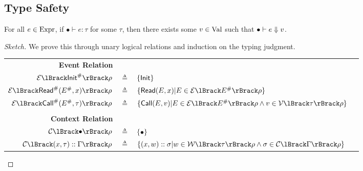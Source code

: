 \subsection{Type Safety}
\begin{theorem}\normalfont
  For all $e\in\text{Expr}$, if $\bullet\vdash e:\tau$ for some $\tau$, then there exists some $v\in\text{Val}$ such that $\bullet\vdash e\Downarrow v$.
\end{theorem}
\begin{proof}[Sketch]
  We prove this through unary logical relations and induction on the typing judgment.

  \begin{tabular}{r@{\hskip2pt}c@{\hskip2pt}l@{\hskip1pt}r}
    \textbf{Event Relation}                        &              &                                                                                                                  & \fbox{$\EvtRel{\Abs\event}\rho$}   \\
    $\EvtRel{\Abs\InitE}\rho$                      & $\triangleq$ & $\{\textsf{Init}\}$                                                                                                                                          \\
    $\EvtRel{\Abs\ReadE(\Abs\event,x)}\rho$        & $\triangleq$ & $\{\ReadE(\event,x)|\event\in\EvtRel{\Abs\event}\rho\}$                                                                                               \\
    $\EvtRel{\Abs\CallE(\Abs\event,\tau)}\rho$     & $\triangleq$ & $\{\CallE(\event,v)|\event\in\EvtRel{\Abs\event}\rho\land v\in\ValRel{\tau}\rho\}$                                                                    \\
    \\
    \textbf{Context Relation}                      &              &                                                                                                                  & \fbox{$\CtxRel{\Gamma}\rho$}       \\
    $\CtxRel{\bullet}\rho$                         & $\triangleq$ & $\{\bullet\}$                                                                                                                                         \\
    $\CtxRel{(x,\tau)\cons\Gamma}\rho$             & $\triangleq$ & $\{(x,w)\cons\ctx|w\in\WalRel{\tau}\rho\land\ctx\in\CtxRel{\Gamma}\rho\}$                                                                             \\

\end{tabular}
\end{proof}
